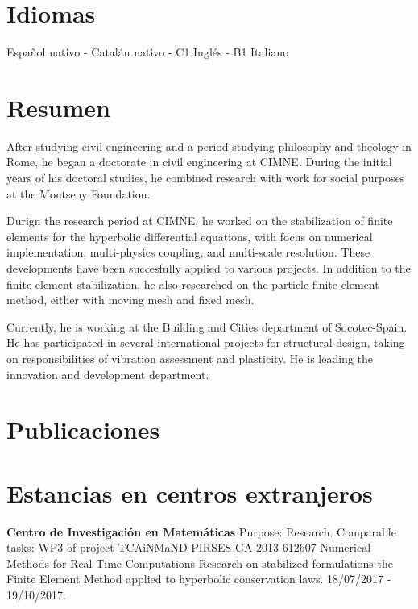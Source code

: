 \documentclass[12pt]{article}
\begin{document}
\section{Idiomas}
Español nativo - Catalán nativo - C1 Inglés - B1 Italiano


\section{Resumen}
After studying civil engineering and a period studying philosophy and theology in Rome, he began
a doctorate in civil engineering at CIMNE. During the initial years of his doctoral studies, he combined
research with work for social purposes at the Montseny Foundation.

Durign the research period at CIMNE, he worked on the stabilization of finite elements for the hyperbolic
differential equations, with focus on numerical implementation, multi-physics coupling, and multi-scale
resolution. These developments have been succesfully applied to various projects. In addition to
the finite element stabilization, he also researched on the particle finite element method, either
with moving mesh and fixed mesh.

Currently, he is working at the Building and Cities department of Socotec-Spain. He has participated
in several international projects for structural design, taking on responsibilities of vibration
assessment and plasticity. He is leading the innovation and development department.


\section{Publicaciones}
\nocite{*}
\printbibliography[heading={subbibliography}, title={Artículos en revistas}, type=article]
\printbibliography[heading={subbibliography}, title={Tesis}, type=thesis]
\printbibliography[heading={subbibliography}, title={Presentaciones en congresos}, type=inproceedings]


\section{Estancias en centros extranjeros}
\textbf{Centro de Investigación en Matemáticas} Purpose: Research. Comparable tasks: WP3 of project
TCAiNMaND-PIRSES-GA-2013-612607 Numerical Methods for Real Time Computations Research on stabilized
formulations the Finite Element Method applied to hyperbolic conservation laws. 18/07/2017 - 19/10/2017.
\end{document}
